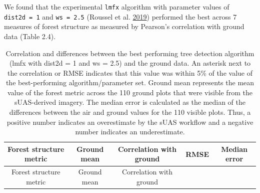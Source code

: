 \documentclass[twoside,12pt,final]{ucthesis-CA2012}
\begin{document}
\begin{ucmainmatter}
We found that the experimental \texttt{lmfx} algorithm with parameter
values of \texttt{dist2d\ =\ 1} and \texttt{ws\ =\ 2.5} (Roussel et al.
\protect\hyperlink{ref-roussel2019}{2019}) performed the best across 7
measures of forest structure as measured by Pearson's correlation with
ground data (Table 2.4).
\begin{longtable}[]{@{}ccccc@{}}
\caption{Correlation and differences between the best performing tree
detection algorithm (lmfx with dist2d = 1 and ws = 2.5) and the ground
data. An asterisk next to the correlation or RMSE indicates that this
value was within 5\% of the value of the best-performing
algorithm/parameter set. Ground mean represents the mean value of the
forest metric across the 110 ground plots that were visible from the
sUAS-derived imagery. The median error is calculated as the median of
the differences between the air and ground values for the 110 visible
plots. Thus, a positive number indicates an overestimate by the sUAS
workflow and a negative number indicates an
underestimate.}\tabularnewline
\toprule
\begin{minipage}[b]{0.28\columnwidth}\centering\strut
Forest structure metric\strut
\end{minipage} & \begin{minipage}[b]{0.13\columnwidth}\centering\strut
Ground mean\strut
\end{minipage} & \begin{minipage}[b]{0.24\columnwidth}\centering\strut
Correlation with ground\strut
\end{minipage} & \begin{minipage}[b]{0.08\columnwidth}\centering\strut
RMSE\strut
\end{minipage} & \begin{minipage}[b]{0.13\columnwidth}\centering\strut
Median error\strut
\end{minipage}\tabularnewline
\midrule
\endfirsthead
\toprule
\begin{minipage}[b]{0.28\columnwidth}\centering\strut
Forest structure metric\strut
\end{minipage} & \begin{minipage}[b]{0.13\columnwidth}\centering\strut
Ground mean\strut
\end{minipage} & \begin{minipage}[b]{0.24\columnwidth}\centering\strut
Correlation with ground\strut
\end{minipage} & \begin{minipage}[b]{0.08\columnwidth}\centering\strut

\end{minipage}
\end{longtable}
\end{ucmainmatter}
\end{document}

